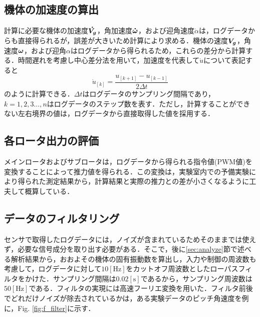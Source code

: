 \subsection{機体の加速度の算出}

計算に必要な機体の加速度$\mbox{\boldmath $\dot{V_g}$}$，角加速度$\mbox{\boldmath $\dot{\omega}$}$，および迎角速度$\dot{\alpha}$は，ログデータからも直接得られるが，誤差が大きいため計算により求める．機体の速度$\mbox{\boldmath $V_g$}$，角速度$\mbox{\boldmath $\omega$}$，および迎角$\alpha$はログデータから得られるため，これらの差分から計算する．時間遅れを考慮し中心差分法を用いて，加速度を代表して$\dot{u}$について表記すると
\begin{equation}
  \dot{u}_{[k]} = \dfrac{u_{[k+1]}-u_{[k-1]}}{2\Delta t}
\end{equation}
のように計算できる．$\Delta t$はログデータのサンプリング間隔であり，$k=1,2,3\hdots,n$はログデータのステップ数を表す．ただし，計算することができない左右境界の値は，ログデータから直接取得した値を採用する．

\subsection{各ロータ出力の評価}

メインロータおよびサブロータは，ログデータから得られる指令値(PWM値)を変換することによって推力値を得られる．この変換は，実験室内での予備実験により得られた測定結果から，計算結果と実際の推力との差が小さくなるように工夫して概算している．\cite{}

\subsection{データのフィルタリング}
\label{sec:filter}

センサで取得したログデータには，ノイズが含まれているためそのままでは使えず，必要な信号成分を取り出す必要がある．そこで，後に\ref{sec:analyze}節で述べる解析結果から，おおよその機体の固有振動数を算出し，入力や制御の周波数も考慮して，ログデータに対して$10\mathrm{[Hz]}$をカットオフ周波数としたローパスフィルタをかけた．サンプリング間隔は$0.02\mathrm{[s]}$であるから，サンプリング周波数は$50\mathrm{[Hz]}$である．フィルタの実現には高速フーリエ変換を用いた．フィルタ前後でどれだけノイズが除去されているかは，ある実験データのピッチ角速度を例に，Fig. \ref{fig:f_filter}に示す．

